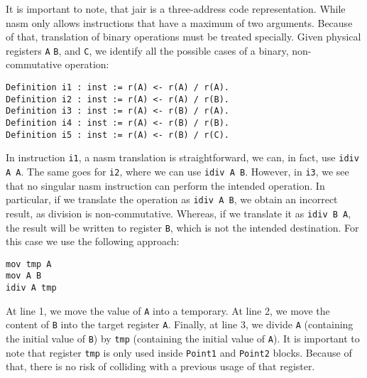 It is important to note, that \gls{jair} is a three-address code representation. While \gls{nasm} only allows instructions that have a maximum of two arguments. Because of that, translation of binary operations must be treated specially.
Given physical registers \texttt A \texttt B, and \texttt C, we identify all the possible cases of a binary, non-commutative operation:
\begin{lstlisting}[style=Rocq]
Definition i1 : inst := r(A) <- r(A) / r(A).
Definition i2 : inst := r(A) <- r(A) / r(B).
Definition i3 : inst := r(A) <- r(B) / r(A).
Definition i4 : inst := r(A) <- r(B) / r(B).
Definition i5 : inst := r(A) <- r(B) / r(C).
\end{lstlisting}


\lstset{style=NASM}
In instruction \texttt{i1}, a \gls{nasm} translation is straightforward, we can, in fact, use \lstinline{idiv A A}. The same goes for \texttt{i2}, where we can use \lstinline{idiv A B}. However, in \texttt{i3}, we see that no singular \gls{nasm} instruction can perform the intended operation. In particular, if we translate the operation as \lstinline{idiv A B}, we obtain an incorrect result, as division is non-commutative. Whereas, if we translate it as \lstinline{idiv B A}, the result will be written to register \texttt B, which is not the intended destination. For this case we use the following approach:

\begin{lstlisting}[style=NASM]
mov tmp A
mov A B
idiv A tmp
\end{lstlisting}

At line 1, we move the value of \texttt A into a temporary. At line 2, we move the content of \texttt B into the target register \texttt A. Finally, at line 3, we divide \texttt A (containing the initial value of \texttt B) by \texttt{tmp} (containing the initial value of \texttt A).
It is important to note that register \texttt{tmp} is only used inside \texttt{Point1} and \texttt{Point2} blocks. Because of that, there is no risk of colliding with a previous usage of that register.

